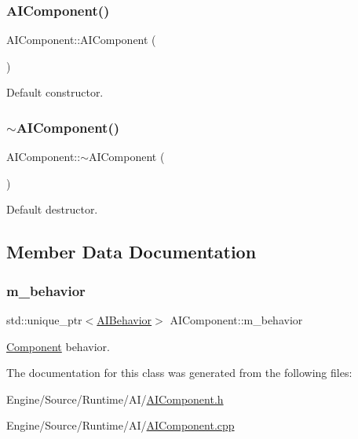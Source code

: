 \subsubsection{\texorpdfstring{A\+I\+Component()}{AIComponent()}}
{\footnotesize\ttfamily A\+I\+Component\+::\+A\+I\+Component (\begin{DoxyParamCaption}{ }\end{DoxyParamCaption})}

Default constructor. \mbox{\label{class_a_i_component_a0ffc6db0d1cb5720b8aaef8ec28f4efe}} 
\subsubsection{\texorpdfstring{$\sim$\+A\+I\+Component()}{~AIComponent()}}
{\footnotesize\ttfamily A\+I\+Component\+::$\sim$\+A\+I\+Component (\begin{DoxyParamCaption}{ }\end{DoxyParamCaption})}

Default destructor. 

\subsection{Member Data Documentation}
\mbox{\label{class_a_i_component_a39ced78aec7dc4cce01017ad2dfb06ea}} 
\subsubsection{\texorpdfstring{m\+\_\+behavior}{m\_behavior}}
{\footnotesize\ttfamily std\+::unique\+\_\+ptr$<$\mbox{\hyperlink{class_a_i_behavior}{A\+I\+Behavior}}$>$ A\+I\+Component\+::m\+\_\+behavior}

\mbox{\hyperlink{class_component}{Component}} behavior. 

The documentation for this class was generated from the following files\+:\begin{DoxyCompactItemize}
\item 
Engine/\+Source/\+Runtime/\+A\+I/\mbox{\hyperlink{_a_i_component_8h}{A\+I\+Component.\+h}}\item 
Engine/\+Source/\+Runtime/\+A\+I/\mbox{\hyperlink{_a_i_component_8cpp}{A\+I\+Component.\+cpp}}\end{DoxyCompactItemize}
